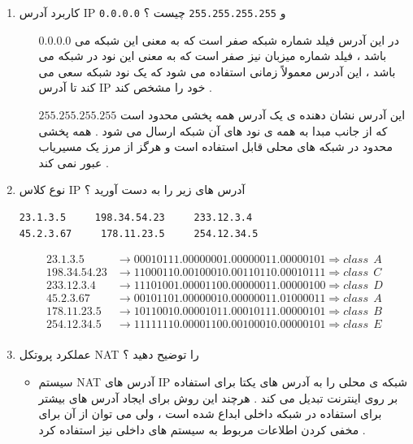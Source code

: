 \documentclass{article}
\begin{document}
\begin{enumerate}
\newpage

\item کاربرد آدرس IP \lstinline{0.0.0.0} و  \lstinline{255.255.255.255} چیست ؟

\begin{tcolorbox}
\begin{itemize}
	\item [$0.0.0.0$] در این آدرس
	فیلد شماره شبکه صفر است که به معنی این شبکه می باشد ، فیلد شماره میزبان نیز صفر است که به معنی این نود در شبکه می باشد ، این آدرس معمولاً زمانی استفاده می شود که یک نود شبکه سعی می کند تا آدرس IP خود را مشخص کند .
	\item [$255.255.255.255$] این آدرس
	نشان دهنده ی یک آدرس همه پخشی محدود است که از 
	جانب مبدا به همه ی نود های آن شبکه ارسال می شود .
	همه پخشی محدود در شبکه های محلی قابل استفاده است و هرگز از مرز یک مسیریاب عبور نمی کند .
\end{itemize}
\end{tcolorbox}

\item نوع کلاس IP آدرس های زیر را به دست آورید ؟\begin{lstlisting}
23.1.3.5     198.34.54.23     233.12.3.4 
45.2.3.67     178.11.23.5     254.12.34.5 
\end{lstlisting}


\begin{tcolorbox}
\begin{align*}
23.1.3.5 &\to 00010111.00000001.00000011.00000101 \Rightarrow class \:\: A \\
198.34.54.23 &\to 11000110.00100010.00110110.00010111 \Rightarrow class \:\: C \\
233.12.3.4 &\to 11101001.00001100.00000011.00000100  \Rightarrow class \:\: D \\
45.2.3.67 &\to 00101101.00000010.00000011.01000011  \Rightarrow class \:\: A \\
178.11.23.5 &\to 10110010.00001011.00010111.00000101 \Rightarrow class \:\: B \\
254.12.34.5 &\to 11111110.00001100.00100010.00000101 \Rightarrow class \:\: E \\
\end{align*}
\end{tcolorbox}


\item عملکرد پروتکل NAT را توضیح دهید ؟

\begin{tcolorbox}
\begin{itemize}
	\item سیستم NAT آدرس های IP 
	شبکه ی محلی را به آدرس های یکتا برای استفاده بر روی اینترنت تبدیل می کند . هرچند این روش برای ایجاد آدرس های بیشتر برای استفاده در شبکه داخلی ابداع شده است ، ولی می توان از آن برای مخفی کردن اطلاعات مربوط به سیستم های داخلی نیز استفاده کرد .
	

\end{itemize}
\end{tcolorbox}
\end{enumerate}
\end{document}
